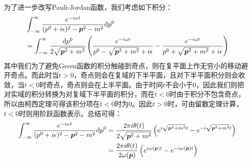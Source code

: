 为了进一步改写Pauli-Jordan函数，我们考虑如下积分：
\begin{align}
&\int_{-\infty}^{\infty}\frac{e^{-i\omega t}}{(p^0+i\epsilon)^2-\boldsymbol{p}^2-m^2}\mathrm{d}p^0\notag\\
&=\int_{-\infty}^{\infty}\frac{\mathrm{d}p^0}{2\sqrt{\boldsymbol{p}^2+m^2}}\left(\frac{e^{-i\omega t}}{p^0-\sqrt{\boldsymbol{p}^2+m^2}+i\epsilon}-\frac{e^{-i\omega t}}{p^0+\sqrt{\boldsymbol{p}^2+m^2}+i\epsilon}\right)
\end{align}
其中我们为了避免Green函数的积分触碰到奇点，则在复平面上作无穷小的移动避开奇点。而此时当$t>0$，奇点则会在复域的下半平面，且对下半平面积分则会收敛，当$t<0$时奇点，奇点则会在上半平面。由于时间$t$不会小于0，因此我们则把对实域的积分转换为对复域下半平面的积分，而在$t<0$时由于积分不包含奇点，所以由柯西定理可得该积分项在$t<0$时为0。因此$t>0$时，可由留数定理计算，$t<0$时则用阶跃函数表示。总结可得：
\begin{align}
\int_{-\infty}^{\infty}\frac{e^{-i\omega t}}{(p^0+i\epsilon)^2-\boldsymbol{p}^2-m^2}\mathrm{d}p^0&=\frac{2\pi i\theta(t)}{2\sqrt{\boldsymbol{p}^2+m^2}}\left(e^{i\sqrt{\boldsymbol{p}^2+m^2}t}-e^{-i\sqrt{\boldsymbol{p}^2+m^2}t}\right)\notag\\
&=\frac{2\pi i\theta(t)}{2\omega(\boldsymbol{p})}\left(e^{i\omega(\boldsymbol{p})t}-e^{-i\omega(\boldsymbol{p})t}\right)
\label{eqitpj}
\end{align}

